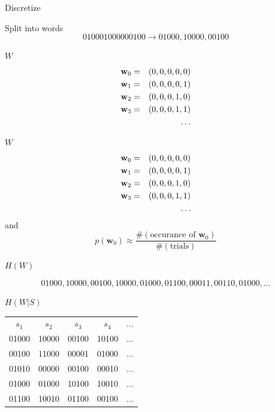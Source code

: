 \documentclass{beamer}
\newcommand{\crish}{\color{reddish}}
\newcommand{\cbla}{\color{black}}
\begin{document}
\begin{frame}{Discretize}
  \crish
  \begin{center}

  \end{center}
  \cbla
  \end{frame}

\begin{frame}{Split into words}
  \crish
  $$
  010001000000100\rightarrow 01000,10000,00100
  $$
  \cbla
\end{frame}


\begin{frame}{$W$}
  \crish
  \begin{eqnarray*}
\textbf{w}_0&=&(0,0,0,0,0)\cr
\textbf{w}_1&=&(0,0,0,0,1)\cr
\textbf{w}_2&=&(0,0,0,1,0)\cr
\textbf{w}_3&=&(0,0,0,1,1)\cr
&&\ldots
\end{eqnarray*}
  \cbla
\end{frame}


\begin{frame}{$W$}
  \crish
  \begin{eqnarray*}
\textbf{w}_0&=&(0,0,0,0,0)\cr
\textbf{w}_1&=&(0,0,0,0,1)\cr
\textbf{w}_2&=&(0,0,0,1,0)\cr
\textbf{w}_3&=&(0,0,0,1,1)\cr
&&\ldots
\end{eqnarray*}
  \cbla
  and
  \crish
  $$p(\mathbf{w}_0)\approx\frac{\#(\mbox{occurance of }\mathbf{w}_0)}{\#(\mbox{trials})}$$
  \cbla
\end{frame}



\begin{frame}{$H(W)$}
  
  $$
  01000,10000,00100,10000,01000,01100,00011,00110,01000,\ldots
  $$
  
  \end{frame}


\begin{frame}{$H(W|S)$}
  \begin{tabular}{ccccc}
   $s_1$&$s_2$&$s_3$&$s_4$&$\ldots$\\  
   01000&10000&00100&10100&$\ldots$\\
   00100&11000&00001&01000&$\ldots$\\
   01010&00000&00100&00010&$\ldots$\\
   01000&01000&10100&10010&$\ldots$\\
   01100&10010&01100&00100&$\ldots$
  \end{tabular}
\end{frame}
\end{document}
